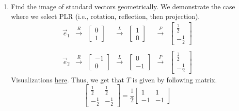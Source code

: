 \begin{SaveQuestion}
\begin{enumerate}
        \item Find the image of standard vectors geometrically. We demonstrate the case where we select PLR (i.e., rotation, reflection, then projection). 
	$$\begin{array}{ccccccc}
	   \vec e_1  & \overset{R}{\longrightarrow}    &\begin{bmatrix} 0 \\ 1 \end{bmatrix} &\overset{L}{\longrightarrow} &\begin{bmatrix} 1 \\ 0 \end{bmatrix} & \overset{P}{\longrightarrow} &\begin{bmatrix} \frac{1}{2} \\ -\frac{1}{2} \end{bmatrix} \\ \\
	     \vec e_2  & \overset{R}{\longrightarrow}    &\begin{bmatrix} -1 \\ 0 \end{bmatrix} &\overset{L}{\longrightarrow} &\begin{bmatrix} 0 \\ -1 \end{bmatrix} & \overset{P}{\longrightarrow} &\begin{bmatrix} \frac{1}{2} \\ -\frac{1}{2} \end{bmatrix}
	\end{array}$$
        Visualizations \href{https://www.desmos.com/calculator/uixbjn2wdc}{here}. Thus, we get that $T$ is given by following matrix.
        $$\begin{bmatrix}  \frac{1}{2} &  \frac{1}{2} \\  -\frac{1}{2} &  -\frac{1}{2} \end{bmatrix} = \frac{1}{2}\begin{bmatrix} 1 & 1 \\ -1 & -1 \end{bmatrix}$$
	

\end{enumerate}
\end{SaveQuestion}
